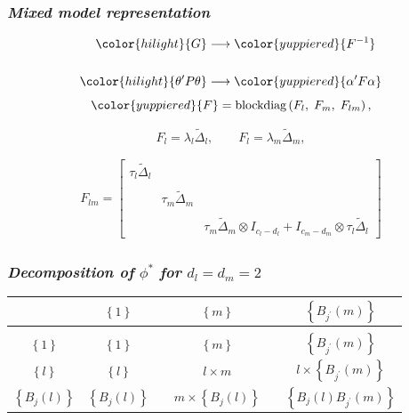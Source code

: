 \documentclass[12pt]{beamer}
\newcommand{\newmaththought}[1]{{ \color{hilight} {#1}}}
\newcommand{\mixedmodelmath}[1]{{ \color{yuppiered} {#1}}}
\newcommand{\ms}{\scriptscriptstyle}
\begin{document}
\begin{frame}
\frametitle{\emph{Mixed model representation}}

\begin{align*}
\newmaththought{G }&\longrightarrow \mixedmodelmath{ F^{-1}}\\
\\
\newmaththought{\theta^\prime P \theta} &\longrightarrow \mixedmodelmath{\alpha^\prime F \alpha}
\end{align*}
\[
\mixedmodelmath{F} = \mbox{blockdiag}\left({F_l},\;{F_m},\;{F_{lm}} \right),
\]

\[
{F_l }= \lambda_l \tilde{\Delta}_l, \qquad{F_l} = \lambda_m \tilde{\Delta}_m,
\]

\begin{align*}
F_{lm}= \begin{bmatrix}
\tau_l \tilde{\Delta}_l 	&	&	 \\
&&\\
	& 	\tau_m \tilde{\Delta}_m	& \\
&&\\
	&	&	\tau_m \tilde{\Delta}_m \otimes I_{\ms{c_l-d_l}} +  I_{\ms{c_m-d_m}} \otimes \tau_l \tilde{\Delta}_l  
\end{bmatrix}
\end{align*}

\end{frame}








\begin{frame}
\frametitle{\emph{Decomposition of} $\phi^*$ \emph{for} $d_l = d_m = 2$}


\begin{table}[h]
\centering %
\begin{tabular}{c|ccccc}
	&    $\left\{ 1 \right\}$	&&	$\left\{m \right\}$	 	&& 	$\left\{ B_{\ms{j^\prime}}\left(m\right) \right\} $ \\ [0.5ex]
\hline %
\\
$\left\{ 1 \right\}$ 				&  $\left\{ 1 \right\}$   	& &	$\left\{m \right\}$	 	&& 	$\left\{ B_{\ms{j^\prime}}\left(m\right) \right\} $	\\  [2.5ex] %
$\left\{l \right\}$		 		&  $\left\{ l \right\}$  	 &&	$l \times m$	 	&& 	$l \times \left\{   B_{\ms{j^\prime}}\left(m\right) \right\} $\\  [2.5ex]
$\left\{ B_j\left(l\right) \right\} $	 	&    $\left\{ B_j\left(l\right) \right\}$	&&	$ m \times \left\{ B_j\left(l\right) \right\}$	& &	$\left\{ B_j\left(l\right) B_{\ms{j^\prime}}\left(m\right) \right\}$ 
\end{tabular}
\end{table}

\end{frame}
\end{document}
